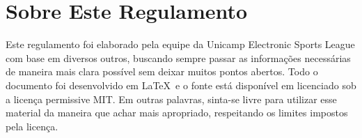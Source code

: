 \section{Sobre Este Regulamento}

Este regulamento foi elaborado pela equipe da Unicamp Electronic Sports League com base em diversos outros, buscando sempre passar as informações necessárias de maneira mais clara possível sem deixar muitos pontos abertos. Todo o documento foi desenvolvido em \LaTeX\ e o fonte está disponível em  licenciado sob a licença permissive MIT. Em outras palavras, sinta-se livre para utilizar esse material da maneira que achar mais apropriado, respeitando os limites impostos pela licença.

